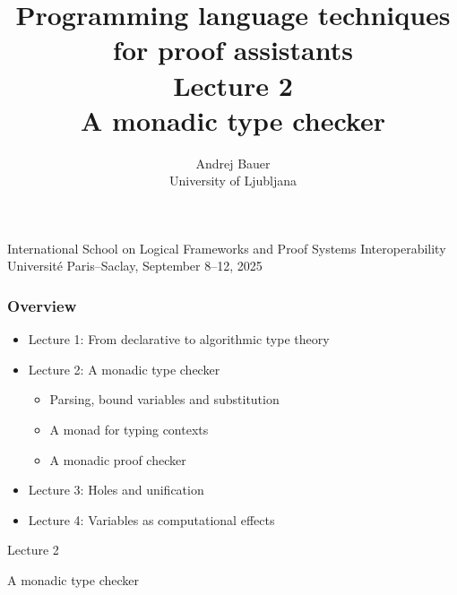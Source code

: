\documentclass[10pt,aspectratio=169]{beamer}
\title{Programming language techniques \\for proof assistants\\[2ex]Lecture 2\\A monadic type checker}
\author{Andrej Bauer\\University of Ljubljana}
\date{}
\begin{document}
\begin{frame}
\hbox{}\vfil

\titlepage

\vfil

\begin{center}
\footnotesize
International School on Logical Frameworks and Proof Systems Interoperability \\
Université Paris--Saclay, September 8--12, 2025
\end{center}

\end{frame}

\begin{frame}
  \frametitle{Overview}

  \begin{itemize}
  \item \textcolor{grayoutColor}{Lecture 1: From declarative to algorithmic type theory}
  \item
    Lecture 2: A monadic type checker
    \begin{itemize}\footnotesize
    \item Parsing, bound variables and substitution
    \item A monad for typing contexts
    \item A monadic proof checker
    \end{itemize}
  \item
    \textcolor{grayoutColor}{Lecture 3: Holes and unification}
  \item
    \textcolor{grayoutColor}{Lecture 4: Variables as computational effects}
  \end{itemize}



\end{frame}

\begin{frame}
  \begin{center}
    \Huge Lecture 2

    \bigskip

    \Large
    A monadic type checker
  \end{center}
\end{frame}
\end{document}
